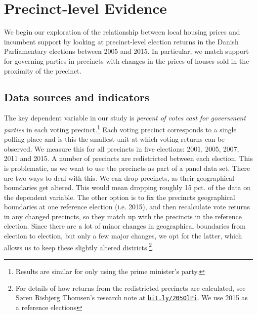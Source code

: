 \documentclass[12pt,a4paper]{article}
\begin{document}


\section{Precinct-level Evidence}
We begin our exploration of the relationship between local housing prices and incumbent support by looking at precinct-level election returns in the Danish Parliamentary elections between 2005 and 2015. In particular, we match support for governing parties in precincts with changes in the prices of houses sold in the proximity of the precinct. 

\subsection{Data sources and indicators}
The key dependent variable in our study is \textit{percent of votes cast for government parties} in each voting precinct.\footnote{Results are similar for only using the prime minister's party.} Each voting precinct corresponds to a single polling place and is this the smallest unit at which voting returns can be observed. We measure this for all precincts in five elections: 2001, 2005, 2007, 2011 and 2015. A number of precincts are redistricted between each election. This is problematic, as we want to use  the precincts as part of a panel data set. There are two ways to deal with this. We can drop precincts, as their geographical boundaries get altered. This would mean dropping roughly 15 pct. of the data on the dependent variable. The other option is to fix the precincts geographical boundaries at one reference election (i.e. 2015), and then recalculate vote returns in any changed precincts, so they match up with the precincts in the reference election. Since there are a lot of minor changes in geographical boundaries from election to election, but only a few major changes, we opt for the latter, which allows us to keep these slightly  altered districts.\footnote{For details of how returns from the redistricted precincts are calculated, see Søren Risbjerg Thomsen's research note at \texttt{\href{http://bit.ly/205OlPi}{bit.ly/205OlPi}}.  We use 2015 as a reference elections}. 
\end{document}
